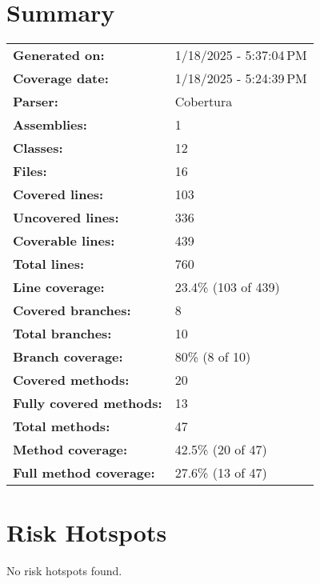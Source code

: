\documentclass[a4paper,landscape,10pt]{article}
\begin{document}
\setcounter{secnumdepth}{-1}
\section{Summary}
\begin{longtable}[l]{ll}
\textbf{Generated on:} & 1/18/2025 - 5:37:04 PM\\
\textbf{Coverage date:} & 1/18/2025 - 5:24:39 PM\\
\textbf{Parser:} & Cobertura\\
\textbf{Assemblies:} & 1\\
\textbf{Classes:} & 12\\
\textbf{Files:} & 16\\
\textbf{Covered lines:} & 103\\
\textbf{Uncovered lines:} & 336\\
\textbf{Coverable lines:} & 439\\
\textbf{Total lines:} & 760\\
\textbf{Line coverage:} & 23.4\% (103 of 439)\\
\textbf{Covered branches:} & 8\\
\textbf{Total branches:} & 10\\
\textbf{Branch coverage:} & 80\% (8 of 10)\\
\textbf{Covered methods:} & 20\\
\textbf{Fully covered methods:} & 13\\
\textbf{Total methods:} & 47\\
\textbf{Method coverage:} & 42.5\% (20 of 47)\\
\textbf{Full method coverage:} & 27.6\% (13 of 47)\\
\end{longtable}
\section{Risk Hotspots}
No risk hotspots found.
\end{document}
